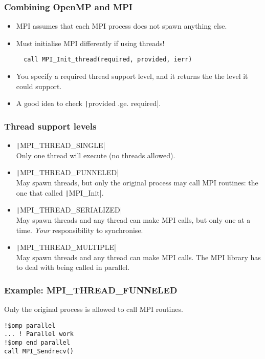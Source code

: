 \documentclass{beamer}
\begin{document}
\begin{frame}[fragile]
\frametitle{Combining OpenMP and MPI}
\begin{itemize}
  \item MPI assumes that each MPI process does not spawn anything else.
  \item Must initialise MPI differently if using threads!
  \begin{verbatim}
  call MPI_Init_thread(required, provided, ierr)
  \end{verbatim}

  \item You specify a required thread support level, and it returns the the level it could support.
  \item A good idea to check \texttt|provided .ge. required|.
\end{itemize}
\end{frame}

\begin{frame}
\frametitle{Thread support levels}
\begin{itemize}
  \item \texttt|MPI_THREAD_SINGLE| \\
  Only one thread will execute (no threads allowed).

  \item \texttt|MPI_THREAD_FUNNELED| \\
  May spawn threads, but only the original process may call MPI routines: the one that called \texttt|MPI_Init|.

  \item \texttt|MPI_THREAD_SERIALIZED| \\
  May spawn threads and any thread can make MPI calls, but only one at a time. \emph{Your} responsibility to synchronise.

  \item \texttt|MPI_THREAD_MULTIPLE| \\
  May spawn threads and any thread can make MPI calls. The MPI library has to deal with being called in parallel.
\end{itemize}

\end{frame}

\begin{frame}[fragile]
\frametitle{Example: MPI\_THREAD\_FUNNELED}
Only the original process is allowed to call MPI routines.
\begin{verbatim}
!$omp parallel
... ! Parallel work
!$omp end parallel
call MPI_Sendrecv()
\end{verbatim}
\end{frame}
\end{document}
